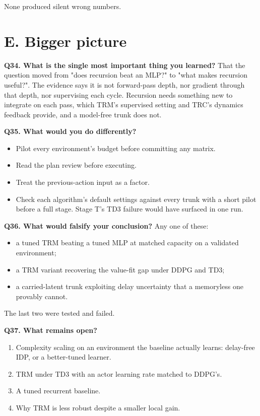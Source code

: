 \documentclass[11pt]{article}
\begin{document}
None produced silent wrong numbers.



\section*{E. Bigger picture}



\textbf{Q34. What is the single most important thing you learned?} That the question moved from "does recursion beat an MLP?" to "what makes recursion useful?". The evidence says it is not forward-pass depth, nor gradient through that depth, nor supervising each cycle. Recursion needs something new to integrate on each pass, which TRM's supervised setting and TRC's dynamics feedback provide, and a model-free trunk does not.



\textbf{Q35. What would you do differently?}

\begin{itemize}
\item Pilot every environment's budget before committing any matrix.
\item Read the plan review before executing.
\item Treat the previous-action input as a factor.
\item Check each algorithm's default settings against every trunk with a short pilot before a full stage. Stage T's TD3 failure would have surfaced in one run.
\end{itemize}



\textbf{Q36. What would falsify your conclusion?} Any one of these:

\begin{itemize}
\item a tuned TRM beating a tuned MLP at matched capacity on a validated environment;
\item a TRM variant recovering the value-fit gap under DDPG and TD3;
\item a carried-latent trunk exploiting delay uncertainty that a memoryless one provably cannot.
\end{itemize}



The last two were tested and failed.



\textbf{Q37. What remains open?}

\begin{enumerate}
\item Complexity scaling on an environment the baseline actually learns: delay-free IDP, or a better-tuned learner.
\item TRM under TD3 with an actor learning rate matched to DDPG's.
\item A tuned recurrent baseline.
\item Why TRM is less robust despite a smaller local gain.
\end{enumerate}
\end{document}
